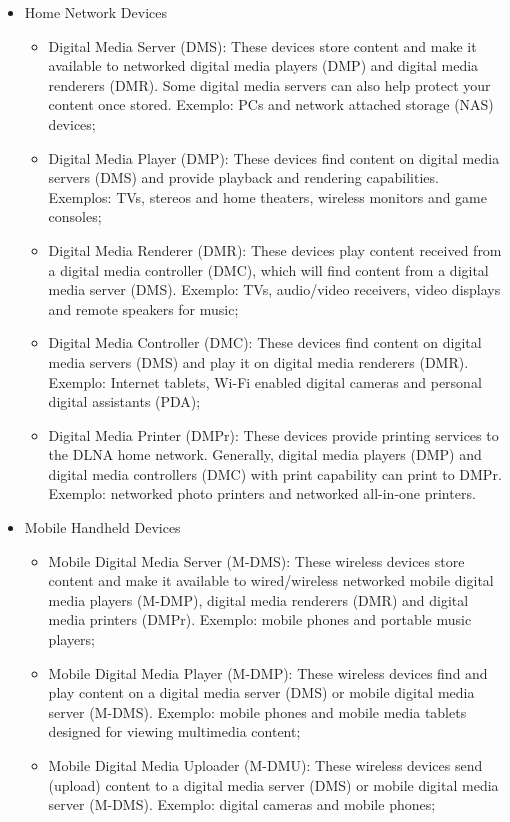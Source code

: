 \begin{itemize}
	\item Home Network Devices
	\begin{itemize}
		\item Digital Media Server (DMS): These devices store content and make it available to networked digital media players (DMP) and digital media renderers (DMR). Some digital media servers can also help protect your content once stored. Exemplo: PCs and network attached storage (NAS) devices;
		\item Digital Media Player (DMP): These devices find content on digital media servers (DMS) and provide playback and rendering capabilities. Exemplos: TVs, stereos and home theaters, wireless monitors and game consoles;
		\item Digital Media Renderer (DMR): These devices play content received from a digital media controller (DMC), which will find content from a digital media server (DMS). Exemplo: TVs, audio/video receivers, video displays and remote speakers for music;
		\item Digital Media Controller (DMC): These devices find content on digital media servers (DMS) and play it on digital media renderers (DMR). Exemplo: Internet tablets, Wi-Fi enabled digital cameras and personal digital assistants (PDA);
		\item Digital Media Printer (DMPr): These devices provide printing services to the DLNA home network. Generally, digital media players (DMP) and digital media controllers (DMC) with print capability can print to DMPr. Exemplo: networked photo printers and networked all-in-one printers.
	\end{itemize}
	\item Mobile Handheld Devices
	\begin{itemize}
		\item Mobile Digital Media Server (M-DMS): These wireless devices store content and make it available to wired/wireless networked mobile digital media players (M-DMP), digital media renderers (DMR) and digital media printers (DMPr). Exemplo: mobile phones and portable music players;
		\item Mobile Digital Media Player (M-DMP): These wireless devices find and play content on a digital media server (DMS) or mobile digital media server (M-DMS). Exemplo: mobile phones and mobile media tablets designed for viewing multimedia content;
		\item Mobile Digital Media Uploader (M-DMU): These wireless devices send (upload) content to a digital media server (DMS) or mobile digital media server (M-DMS). Exemplo: digital cameras and mobile phones;

\end{itemize}
\end{itemize}
